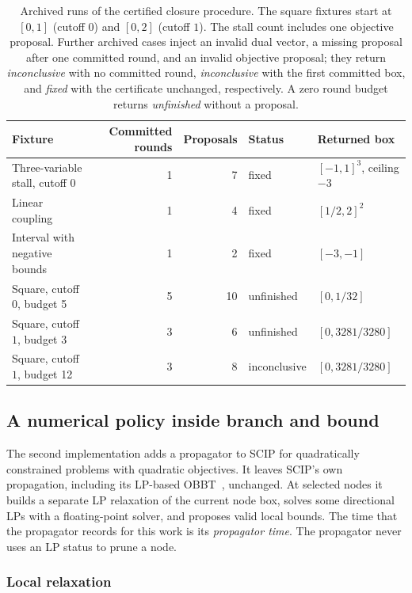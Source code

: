 \begin{table}[htbp]
\centering
\small
\begin{tabular}{@{}lrrll@{}}
\toprule
Fixture & Committed rounds & Proposals & Status & Returned box\\
\midrule
Three-variable stall, cutoff $0$ & 1 & 7 & fixed & $[-1,1]^3$, ceiling $-3$\\
Linear coupling & 1 & 4 & fixed & $[1/2,2]^2$\\
Interval with negative bounds & 1 & 2 & fixed & $[-3,-1]$\\
Square, cutoff $0$, budget 5 & 5 & 10 & unfinished & $[0,1/32]$\\
Square, cutoff $1$, budget 3 & 3 & 6 & unfinished & $[0,3281/3280]$\\
Square, cutoff $1$, budget 12 & 3 & 8 & inconclusive & $[0,3281/3280]$\\
\bottomrule
\end{tabular}
\caption{Archived runs of the certified closure procedure. The square fixtures
start at $[0,1]$ (cutoff $0$) and $[0,2]$ (cutoff $1$). The stall count includes
one objective proposal. Further archived cases inject an invalid dual vector,
a missing proposal after one committed round, and an invalid objective
proposal; they return \emph{inconclusive} with no committed round,
\emph{inconclusive} with the first committed box, and \emph{fixed} with the
certificate unchanged, respectively. A zero round budget returns
\emph{unfinished} without a proposal.}
\label{tab:closure-runs}
\end{table}

\subsection{A numerical policy inside branch and bound}\label{sec:algorithms-policy}

The second implementation adds a propagator to SCIP for quadratically
constrained problems with quadratic objectives. It leaves SCIP's own
propagation, including its LP-based
OBBT~\cite{gleixner2017-three-enhancements-for-optimization-based},
unchanged. At selected nodes it
builds a separate LP relaxation of the current node box, solves some
directional LPs with a floating-point solver, and proposes valid local bounds.
The time that the propagator records for this work is its \emph{propagator
time}. The propagator never uses an LP status to prune a node.

\subsubsection{Local relaxation}

